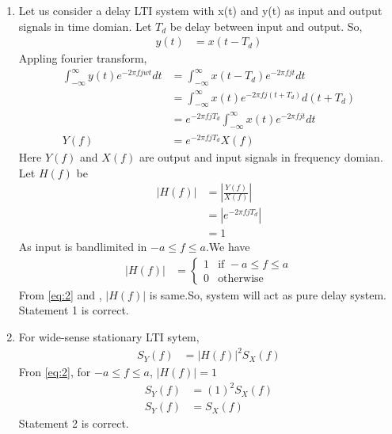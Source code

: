 \documentclass[journal,12pt,twocolumn]{IEEEtran}
\theoremstyle{remark}
\begin{document}
\begin{enumerate}
\item Let us consider a delay LTI system with x(t) and y(t) as input and output signals in time domian. Let $T_d$ be delay between input and output. So,
\begin{align}
y(t)&=x(t-T_d)
\end{align}
Appling fourier transform,
\begin{align}
\int_{-\infty}^{\infty}y(t)e^{-2\pi fjwt}dt&=\int_{-\infty}^{\infty}x(t-T_d)e^{-2\pi fjt}dt\\
&=\int_{-\infty}^{\infty}x(t)e^{-2\pi fj(t+T_d)}d(t+T_d)\\
&=e^{-2\pi fjT_d}\int_{-\infty}^{\infty}x(t)e^{-2\pi fjt}dt\\
Y(f)&=e^{-2\pi fjT_d}X(f)
\end{align}
Here $Y(f)$ and $X(f)$ are output and input signals in frequency domian. Let $H(f)$ be 
\begin{align}
|H(f)|&=\left|\frac{Y(f)}{X(f)}\right|\\
&=\left|e^{-2\pi fjT_d}\right|\\
&=1
\label{eq:1}
\end{align}
As input is bandlimited in $-a\leq f \leq a$.We have
\begin{align}
|H(f)| &= 
        \begin{cases}
            1 & \text{if }-a \leq f \leq a\\
            0 & \text{otherwise}
        \end{cases}\label{eq:2}
\end{align}
From \eqref{eq:2} and , $|H(f)|$ is same.So, system will act as pure delay system. Statement 1 is correct.
\item For wide-sense stationary LTI sytem,
\begin{align}
S_Y(f)&=|H(f)|^2S_X(f)
\end{align}
Fron \eqref{eq:2}, for $-a \leq f \leq a$, $|H(f)|=1$
\begin{align}
S_Y(f)&=(1)^2S_X(f)\\
S_Y(f)&=S_X(f)
\end{align}
Statement 2 is correct.
\end{enumerate}
\end{document}
